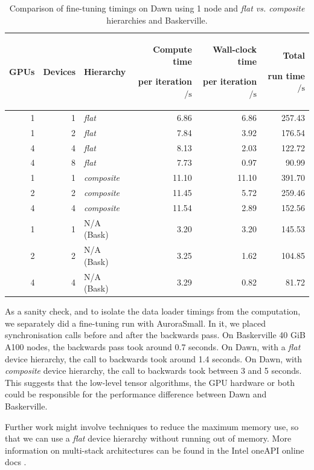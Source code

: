 \begin{table}[t] %
    \centering
    \begin{tabular}{@{}rrlrrr@{}}
      \toprule
      GPUs
      & Devices
      & Hierarchy
      & \shortstack[r]{Compute time\strut \\ per iteration ${}/\unit{\second}$}
      & \shortstack[r]{Wall-clock time\strut \\ per iteration ${}/\unit{\second}$}
      & \shortstack[r]{Total\strut \\ run time ${}/\unit{\second}$} \\ \midrule
          1  & 1&\textit{flat}& 6.86& 6.86& 257.43\\
  1& 2& \textit{flat}& 7.84& 3.92&176.54\\
          4& 4&\textit{flat}& 8.13& 2.03& 122.72\\
          4  & 8&\textit{flat}& 7.73& 0.97& 90.99\\
          1& 1&\textit{composite}& 11.10& 11.10& 391.70\\
  2& 2& \textit{composite}& 11.45& 5.72&259.46\\
          4& 4&\textit{composite}& 11.54& 2.89& 152.56\\
  1& 1& N/A (Bask)& 3.20& 3.20&145.53\\
  2& 2& N/A (Bask)& 3.25& 1.62&104.85\\
  4& 4& N/A (Bask)&  3.29& 0.82&81.72\\ \bottomrule
    \end{tabular}
    \caption{Comparison of fine-tuning timings on Dawn using 1 node and \textit{flat vs. composite} hierarchies and Baskerville.}
    \label{tab:flat-vs-composite-Dawn}
\end{table}

As a sanity check, and to isolate the data loader timings from the computation, we separately did a fine-tuning run with AuroraSmall. In it, we placed synchronisation calls before and after the backwards pass. On Baskerville 40 GiB A100 nodes, the backwards pass took around 0.7 seconds. On Dawn, with a \textit{flat} device hierarchy, the call to backwards took around 1.4 seconds. On Dawn, with \textit{composite} device hierarchy, the call to backwards took between 3 and 5 seconds.
This suggests that the low-level tensor algorithms, the GPU hardware or both could be responsible for the performance difference between Dawn and Baskerville.

Further work might involve techniques to reduce the maximum memory use, so that we can use a \textit{flat} device hierarchy without running out of memory.
More information on multi-stack architectures can be found in the Intel oneAPI online docs \cite{oneapi_multi_stack}.

